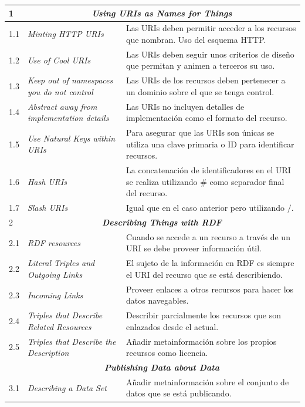 \begin{longtable}[c]{|l|p{6.5cm}|p{7.5cm}|}
\endhead
   1& \multicolumn{2}{|c|}{\textbf{\textit{Using URIs as Names for Things}}}\\ \hline
   1.1 &  \textit{Minting \gls{HTTP URI}s} & Las URIs deben permitir acceder a los recursos que nombran. Uso del esquema HTTP. \\ \hline
   1.2 &  \textit{Use of Cool URIs} &  Las URIs deben seguir unos criterios de diseño que permitan y animen a terceros su uso.\\ \hline
   1.3 &  \textit{Keep out of namespaces you do not control} &  Las URIs de los recursos deben pertenecer a un dominio sobre el que se tenga control.\\ \hline
   1.4 &  \textit{Abstract away from implementation details} & Las URIs no incluyen detalles de implementación como el formato del recurso. \\ \hline
   1.5 &  \textit{Use Natural Keys within URIs} &  Para asegurar que las URIs son únicas se utiliza una clave primaria o ID para identificar recursos.\\ \hline
   1.6 &  \textit{Hash URIs} &  La concatenación de identificadores en el URI se realiza utilizando \# como separador final del recurso.\\ \hline
   1.7 &  \textit{Slash URIs} &  Igual que en el caso anterior pero utilizando $/$. \\ \hline
   2&\multicolumn{2}{|c|}{\textbf{\textit{Describing Things with RDF}}}\\ \hline
   2.1 &  \textit{\gls{RDF} resources} & Cuando se accede a un recurso a través de un \gls{URI} se debe proveer información útil. \\ \hline
   2.2 &  \textit{Literal Triples and Outgoing Links} & El sujeto de la información en RDF es siempre el URI del recurso que se está describiendo. \\ \hline
   2.3 &  \textit{Incoming Links} & Proveer enlaces a otros recursos para hacer los datos navegables. \\ \hline
   2.4 &  \textit{Triples that Describe Related Resources} & Describir parcialmente los recursos que son enlazados desde el actual. \\ \hline
   2.5 &  \textit{Triples that Describe the Description} & Añadir metainformación sobre los propios recursos como licencia. \\ \hline
\newpage
  3&\multicolumn{2}{|c|}{\textbf{\textit{Publishing Data about Data}}}\\ \hline
   3.1 &  \textit{Describing a Data Set} & Añadir metainformación sobre el conjunto de datos que se está publicando. \\ \hline

\end{longtable}
